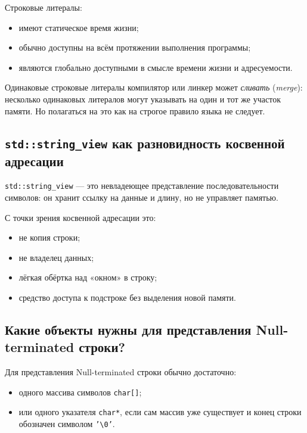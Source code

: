 Строковые литералы:
\begin{itemize}
    \item имеют статическое время жизни;
    \item обычно доступны на всём протяжении выполнения программы;
    \item являются глобально доступными в смысле времени жизни и адресуемости.
\end{itemize}

\begin{remark}
Одинаковые строковые литералы компилятор или линкер может \textit{сливать} (\textit{merge}): несколько одинаковых литералов могут указывать на один и тот же участок памяти. Но полагаться на это как на строгое правило языка не следует.
\end{remark}

\subsection{\texttt{std::string\_view} как разновидность косвенной адресации}
\begin{definition}
\texttt{std::string\_view} — это невладеющее представление последовательности символов: он хранит ссылку на данные и длину, но не управляет памятью.
\end{definition}

С точки зрения косвенной адресации это:
\begin{itemize}
    \item не копия строки;
    \item не владелец данных;
    \item лёгкая обёртка над «окном» в строку;
    \item средство доступа к подстроке без выделения новой памяти.
\end{itemize}

\subsection{Какие объекты нужны для представления Null-terminated строки?}
Для представления Null-terminated строки обычно достаточно:
\begin{itemize}
    \item одного массива символов \texttt{char[]};
    \item или одного указателя \texttt{char*}, если сам массив уже существует и конец строки обозначен символом \texttt{'\textbackslash 0'}.
\end{itemize}

